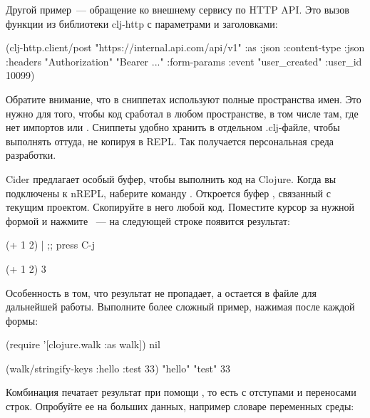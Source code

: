 Другой пример~--- обращение ко внешнему сервису по HTTP API. Это вызов функции  из библиотеки clj-http с параметрами и заголовками:

\begin{english}
  \begin{clojure}
(clj-http.client/post
 "https://internal.api.com/api/v1"
 {:as :json
  :content-type :json
  :headers {"Authorization" "Bearer ..."}
  :form-params {:event "user_created"
                :user_id 10099}})
  \end{clojure}
\end{english}

Обратите внимание, что в сниппетах используют полные пространства имен. Это нужно для того, чтобы код сработал в любом пространстве, в том числе там, где нет импортов  или . Сниппеты удобно хранить в отдельном .clj-файле, чтобы выполнять оттуда, не копируя в REPL. Так получается персональная среда разработки.

Cider предлагает особый буфер, чтобы выполнить код на Clojure. Когда вы подключены к nREPL, наберите команду . Откроется буфер , связанный с текущим проектом. Скопируйте в него любой код. Поместите курсор за нужной формой и нажмите ~--- на следующей строке появится результат:

\begin{english}
  \begin{clojure}
(+ 1 2) | ;; press C-j

(+ 1 2)
3
  \end{clojure}
\end{english}

Особенность  в том, что результат не пропадает, а остается в файле для дальнейшей работы. Выполните более сложный пример, нажимая  после каждой формы:

\begin{english}
  \begin{clojure}
(require '[clojure.walk :as walk])
nil

(walk/stringify-keys {:hello {:test 33}})
{"hello" {"test" 33}}
  \end{clojure}
\end{english}

Комбинация  печатает результат при помощи , то есть с отступами и переносами строк. Опробуйте ее на больших данных, например словаре переменных среды:

